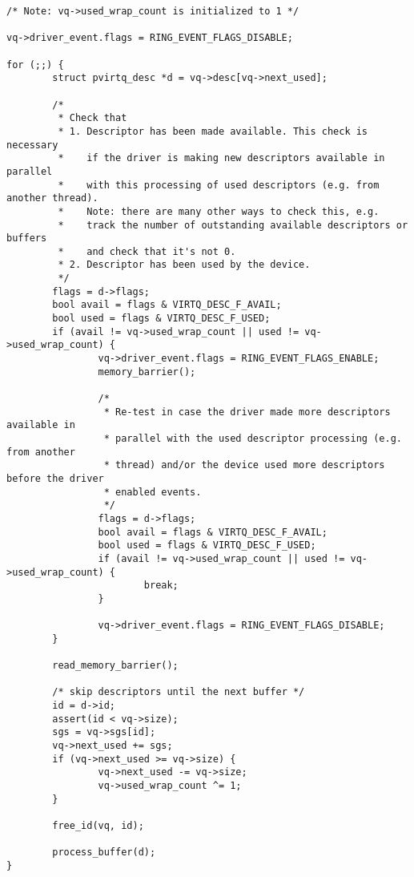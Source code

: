 \begin{lstlisting}
/* Note: vq->used_wrap_count is initialized to 1 */

vq->driver_event.flags = RING_EVENT_FLAGS_DISABLE;

for (;;) {
        struct pvirtq_desc *d = vq->desc[vq->next_used];

        /*
         * Check that
         * 1. Descriptor has been made available. This check is necessary
         *    if the driver is making new descriptors available in parallel
         *    with this processing of used descriptors (e.g. from another thread).
         *    Note: there are many other ways to check this, e.g.
         *    track the number of outstanding available descriptors or buffers
         *    and check that it's not 0.
         * 2. Descriptor has been used by the device.
         */
        flags = d->flags;
        bool avail = flags & VIRTQ_DESC_F_AVAIL;
        bool used = flags & VIRTQ_DESC_F_USED;
        if (avail != vq->used_wrap_count || used != vq->used_wrap_count) {
                vq->driver_event.flags = RING_EVENT_FLAGS_ENABLE;
                memory_barrier();

                /*
                 * Re-test in case the driver made more descriptors available in
                 * parallel with the used descriptor processing (e.g. from another
                 * thread) and/or the device used more descriptors before the driver
                 * enabled events.
                 */
                flags = d->flags;
                bool avail = flags & VIRTQ_DESC_F_AVAIL;
                bool used = flags & VIRTQ_DESC_F_USED;
                if (avail != vq->used_wrap_count || used != vq->used_wrap_count) {
                        break;
                }

                vq->driver_event.flags = RING_EVENT_FLAGS_DISABLE;
        }

        read_memory_barrier();

        /* skip descriptors until the next buffer */
        id = d->id;
        assert(id < vq->size);
        sgs = vq->sgs[id];
        vq->next_used += sgs;
        if (vq->next_used >= vq->size) {
                vq->next_used -= vq->size;
                vq->used_wrap_count ^= 1;
        }

        free_id(vq, id);

        process_buffer(d);
}
\end{lstlisting}
